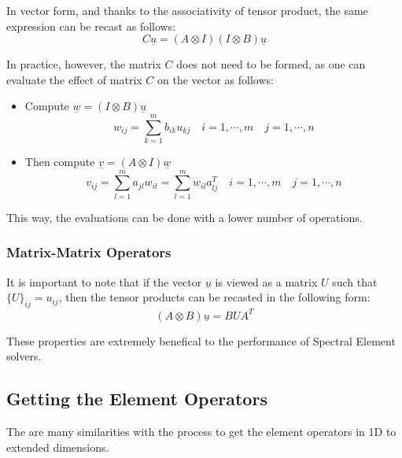 \documentclass[
  a4paper,
  10pt]{article}
\providecommand{\tightlist}{%
  \setlength{\itemsep}{0pt}\setlength{\parskip}{0pt}}
\begin{document}
In vector form, and thanks to the associativity of tensor product, the
same expression can be recast as follows: \begin{equation}
    C\underline{u}=(A \otimes I)(I \otimes B)\underline{u}
\end{equation}

In practice, however, the matrix \(C\) does not need to be formed, as
one can evaluate the effect of matrix \(C\) on the vector as follows:

\begin{itemize}
\tightlist
\item
  Compute \(\underline{w}=(I \otimes B)\underline{u}\) \begin{equation}
        w_{ij}=\sum_{k=1}^{m} b_{ik} u_{kj} \quad i=1,\cdots,m \quad j=1,\cdots,n
  \end{equation}
\item
  Then compute \(\underline{v}=(A \otimes I)\underline{w}\)
  \begin{equation}
        v_{ij}=\sum_{l=1}^{m} a_{jl} w_{il}  = \sum_{l=1}^{m} w_{il} a_{lj}^{T}  \quad i=1,\cdots,m \quad j=1,\cdots,n
  \end{equation}
\end{itemize}

This way, the evaluations can be done with a lower number of operations.

\hypertarget{matrix-matrix-operators}{%
\subsubsection{Matrix-Matrix Operators}\label{matrix-matrix-operators}}

It is important to note that if the vector \(\underline{u}\) is viewed
as a matrix \(U\) such that \(\{U\}_{ij}=u_{ij}\), then the tensor
products can be recasted in the following form: \begin{equation}
        (A \otimes B)\underline{u} = BUA^{T}
    \end{equation}

These properties are extremely benefical to the performance of Spectral
Element solvers.

\hypertarget{getting-the-element-operators}{%
\subsection{Getting the Element
Operators}\label{getting-the-element-operators}}

The are many similarities with the process to get the element operators
in 1D to extended dimensions.
\end{document}
